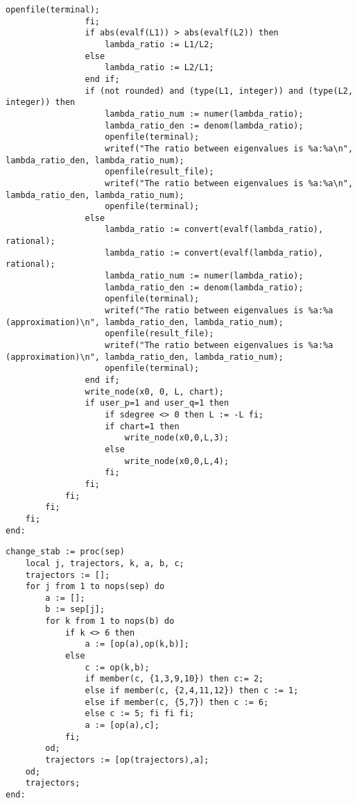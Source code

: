 \documentclass[a4paper,10pt]{article}
\begin{document}
\begin{lstlisting}[name=infinity]
                     openfile(terminal);
                fi;
                if abs(evalf(L1)) > abs(evalf(L2)) then
                    lambda_ratio := L1/L2;
                else
                    lambda_ratio := L2/L1;
                end if;
                if (not rounded) and (type(L1, integer)) and (type(L2, integer)) then 
                    lambda_ratio_num := numer(lambda_ratio);
                    lambda_ratio_den := denom(lambda_ratio);
                    openfile(terminal);
                    writef("The ratio between eigenvalues is %a:%a\n", lambda_ratio_den, lambda_ratio_num);
                    openfile(result_file);
                    writef("The ratio between eigenvalues is %a:%a\n", lambda_ratio_den, lambda_ratio_num);
                    openfile(terminal);
                else
                    lambda_ratio := convert(evalf(lambda_ratio), rational);
                    lambda_ratio := convert(evalf(lambda_ratio), rational);
                    lambda_ratio_num := numer(lambda_ratio);
                    lambda_ratio_den := denom(lambda_ratio);
                    openfile(terminal);
                    writef("The ratio between eigenvalues is %a:%a (approximation)\n", lambda_ratio_den, lambda_ratio_num);
                    openfile(result_file);
                    writef("The ratio between eigenvalues is %a:%a (approximation)\n", lambda_ratio_den, lambda_ratio_num);
                    openfile(terminal);
                end if;
                write_node(x0, 0, L, chart);
                if user_p=1 and user_q=1 then
                    if sdegree <> 0 then L := -L fi;
                    if chart=1 then
                        write_node(x0,0,L,3);
                    else
                        write_node(x0,0,L,4);
                    fi;
                fi;
            fi;
        fi;
    fi;
end:
\end{lstlisting}

\begin{lstlisting}[name=infinity]
change_stab := proc(sep)
    local j, trajectors, k, a, b, c;
    trajectors := [];
    for j from 1 to nops(sep) do
        a := [];
        b := sep[j];
        for k from 1 to nops(b) do
            if k <> 6 then
                a := [op(a),op(k,b)];
            else
                c := op(k,b);
                if member(c, {1,3,9,10}) then c:= 2;
                else if member(c, {2,4,11,12}) then c := 1;
                else if member(c, {5,7}) then c := 6;
                else c := 5; fi fi fi;
                a := [op(a),c];
            fi;
        od;
        trajectors := [op(trajectors),a];
    od;
    trajectors;
end:
\end{lstlisting}
\end{document}
